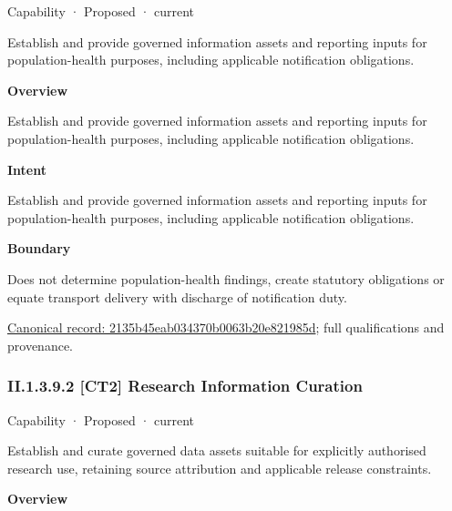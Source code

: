 \label{element:2135b45eab034370b0063b20e821985d}
{\small Capability · Proposed · current}\par

Establish and provide governed information assets and reporting inputs for population-health purposes, including applicable notification obligations.



\textbf{Overview}



Establish and provide governed information assets and reporting inputs for population-health purposes, including applicable notification obligations.



\textbf{Intent}



Establish and provide governed information assets and reporting inputs for population-health purposes, including applicable notification obligations.



\textbf{Boundary}



Does not determine population-health findings, create statutory obligations or equate transport delivery with discharge of notification duty.


{\footnotesize \href{../../../../continuum/strategy/capability/2135b45eab034370b0063b20e821985d.md}{Canonical record: 2135b45eab034370b0063b20e821985d}; full qualifications and provenance.}\par
\subsubsection*{II.1.3.9.2 [CT2] Research Information Curation}
\label{navigation:II.1.3.9.2}

\label{element:4f5b8cec90324c2989cdc30e80bc8cb9}
{\small Capability · Proposed · current}\par

Establish and curate governed data assets suitable for explicitly authorised research use, retaining source attribution and applicable release constraints.



\textbf{Overview}



